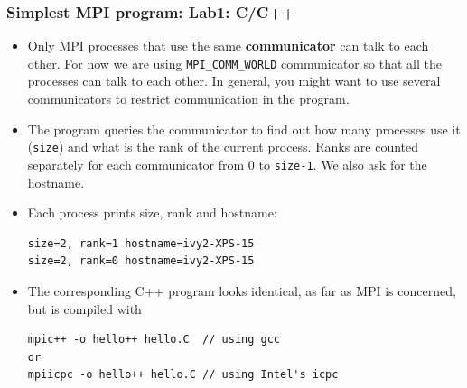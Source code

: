 \documentclass{beamer}
\begin{document}
\begin{frame}[fragile]
  \frametitle{Simplest MPI program: Lab1: C/C++}
\begin{itemize}
  \item Only MPI processes that use the same {\color{mycolordef}\textbf{communicator}} can talk to each other. 
    For now we are using {\color{mycolorcode}\verb|MPI_COMM_WORLD|} communicator so that all the processes can talk to each other. In general, you might want to use several
    communicators to restrict communication in the program.
  \item The program queries the communicator to find out how many processes use it ({\color{mycolorcode}\verb|size|}) and what is the rank of the current process. 
    Ranks are counted separately for each communicator from {\color{mycolorcode}0} to {\color{mycolorcode}\verb|size-1|}. We also ask for the hostname.
  \item Each process prints size, rank and hostname:
{\small
{\color{mycolorcli}
\begin{verbatim}
size=2, rank=1 hostname=ivy2-XPS-15
size=2, rank=0 hostname=ivy2-XPS-15
\end{verbatim}
}
}
\item The corresponding C++ program looks identical, as far as MPI is concerned, but is compiled with
{\small
{\color{mycolorcli}
\begin{verbatim}
mpic++ -o hello++ hello.C  // using gcc
or
mpiicpc -o hello++ hello.C // using Intel's icpc
\end{verbatim}
}
}
\end{itemize}
\end{frame}
\end{document}
